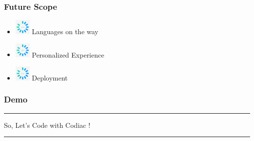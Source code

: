 \documentclass[14pt]{beamer}
\begin{document}
\begin{frame}
    \frametitle{Future Scope}
	\noindent                                                                                                       {\color{pink} \rule{\linewidth}{0.7mm}} 
         \begin{itemize}
 \item [] \includegraphics[width=0.3in, height=0.3in]{./logos/loading.jpg} Languages on the way\\
     \pause
 \item [] \includegraphics[width=0.3in, height=0.3in]{./logos/loading.jpg} Personalized Experience \\
     \pause
 \item [] \includegraphics[width=0.3in, height=0.3in]{./logos/loading.jpg} Deployment\\
 \end{itemize}
\noindent{	
	   \color{pink} \rule{\linewidth}{0.7mm} }   	
\end{frame}	


\begin{frame}
	\frametitle{Demo}
    {\color{dr} \rule{\linewidth}{0.7mm}}
    \linebreak
    \linebreak
    \centerline
    {\huge \color{dr}
   So, Let's Code with  Codiac !}
    \linebreak

    {\color{dr} \rule{\linewidth}{0.7mm}}
\end{frame}
\end{document}
